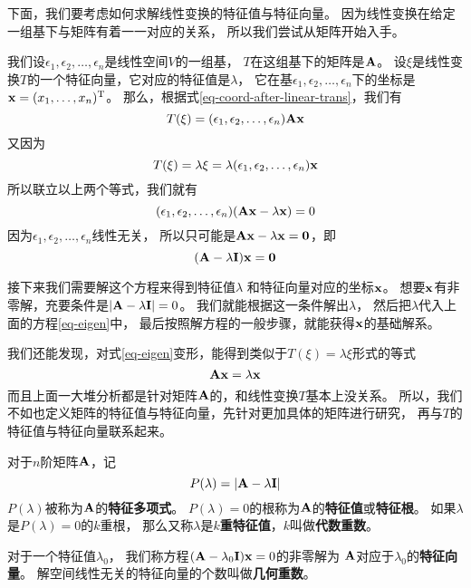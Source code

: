 下面，我们要考虑如何求解线性变换的特征值与特征向量。
因为线性变换在给定一组基下与矩阵有着一一对应的关系，
所以我们尝试从矩阵开始入手。

我们设$\epsilon_1,\epsilon_2,\dots,\epsilon_n$是线性空间$V$的一组基，
$T$在这组基下的矩阵是$\mathbf{A}$。
设$\xi$是线性变换$T$的一个特征向量，它对应的特征值是$\lambda$，
它在基$\epsilon_1,\epsilon_2,\dots,\epsilon_n$下的坐标是
$\mathbf{x}=(x_1,\dots,x_n)^{\textrm{T}}$。
那么，根据式\ref{eq-coord-after-linear-trans}，我们有
\[ T(\xi) = (\epsilon_1,\epsilon_2,\dots,\epsilon_n)\mathbf{A}\mathbf{x} \]
又因为
\[ T(\xi) = \lambda\xi = \lambda(\epsilon_1,\epsilon_2,\dots,\epsilon_n)\mathbf{x} \]
所以联立以上两个等式，我们就有
\begin{displaymath}
  (\epsilon_1,\epsilon_2,\dots,\epsilon_n)(\mathbf{A}\mathbf{x} - \lambda\mathbf{x})=0
\end{displaymath}
因为$\epsilon_1,\epsilon_2,\dots,\epsilon_n$线性无关，
所以只可能是$\mathbf{A}\mathbf{x} - \lambda\mathbf{x} = \mathbf{0}$，即
\begin{equation} \label{eq-eigen}
  (\mathbf{A} - \lambda\mathbf{I})\mathbf{x} = \mathbf{0}
\end{equation}

接下来我们需要解这个方程来得到特征值$\lambda$
和特征向量对应的坐标$\mathbf{x}$。
想要$\mathbf{x}$有非零解，充要条件是$|\mathbf{A} - \lambda\mathbf{I}| = 0$。
我们就能根据这一条件解出$\lambda$，
然后把$\lambda$代入上面的方程\ref{eq-eigen}中，
最后按照解方程的一般步骤，就能获得$\mathbf{x}$的基础解系。

我们还能发现，对式\ref{eq-eigen}变形，能得到类似于$T(\xi)=\lambda\xi$形式的等式
\begin{displaymath}
\mathbf{A}\mathbf{x}=\lambda\mathbf{x}
\end{displaymath}
而且上面一大堆分析都是针对矩阵$\mathbf{A}$的，和线性变换$T$基本上没关系。
所以，我们不如也定义矩阵的特征值与特征向量，先针对更加具体的矩阵进行研究，
再与$T$的特征值与特征向量联系起来。

\begin{definition}[矩阵的特征值和特征向量]
  对于$n$阶矩阵$\mathbf{A}$，记
  \[P(\lambda)=|\mathbf{A}-\lambda\mathbf{I}|\]
  $P(\lambda)$被称为$\mathbf{A}$的\textbf{特征多项式}。
  $P(\lambda)=0$的根称为$\mathbf{A}$的\textbf{特征值}或\textbf{特征根}。
  如果$\lambda$是$P(\lambda)=0$的$k$重根，
  那么又称$\lambda$是\textbf{$k$重特征值}，$k$叫做\textbf{代数重数}。
  
  对于一个特征值$\lambda_0$，
  我们称方程$(\mathbf{A}-\lambda_0\mathbf{I})\mathbf{x}=0$的非零解为
  $\mathbf{A}$对应于$\lambda_0$的\textbf{特征向量}。
  解空间线性无关的特征向量的个数叫做\textbf{几何重数}。
\end{definition}

